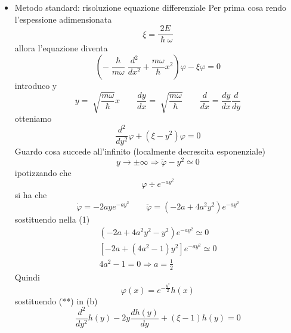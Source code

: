 \begin{itemize}
    \item Metodo standard: risoluzione equazione differenziale \newline
    Per prima cosa rendo l'espessione adimensionata 
    \begin{equation*}
        \xi = \frac{2E}{\hslash\omega} \tag{a}
    \end{equation*}
    allora l'equazione diventa
    \begin{equation*}
        \left(-\frac{\hslash}{m\omega} \frac{d^2}{dx^2} + \frac{m\omega}{\hslash} x^2\right)\varphi - \xi\varphi = 0 
    \end{equation*}
    introduco y
    \begin{equation*}
        y = \sqrt[]{\frac{m\omega}{\hslash}} x \qquad \frac{dy}{dx} = \sqrt[]{\frac{m\omega}{\hslash}} \qquad \frac{d}{dx} = \frac{dy}{dx} \frac{d}{dy}
    \end{equation*}
    otteniamo
    \begin{equation*}
        \frac{d^2}{dy^2} \varphi + (\xi - y^2)\varphi = 0 \tag{b}
    \end{equation*}
    Guardo cosa succede all'infinito (localmente decrescita esponenziale)
    \begin{equation*}
        y \to \pm \infty \Rightarrow \ddot{\varphi} - y^2 \simeq 0 \tag{1}
    \end{equation*}
    ipotizzando che 
    \begin{equation*}
        \varphi \div e^{-ay^2}
    \end{equation*}
    si ha che 
    \begin{equation*}
        \dot{\varphi} = -2aye^{-ay^2} \qquad \ddot{\varphi} = (-2a + 4a^2y^2) e^{-ay^2}
    \end{equation*}
    sostituendo nella (1) 
    \begin{gather*}
        (-2a + 4a^2y^2 - y^2) e^{-ay^2} \simeq 0 \\
        [-2a + (4a^2 - 1)y^2] e^{-ay^2} \simeq 0 \\
        4a^2 - 1 = 0 \Rightarrow a = \frac{1}{2}
    \end{gather*}
    Quindi
    \begin{equation*}
        \varphi(x) = e^{-\frac{y^2}{2}}h(x) \tag{**}
    \end{equation*}
    sostituendo (**) in (b) 
    \begin{equation*}
        \frac{d^2}{dy^2} h(y) - 2y \frac{dh(y)}{dy} + (\xi-1)h(y) = 0 \tag{2} 
    \end{equation*}

\end{itemize}
